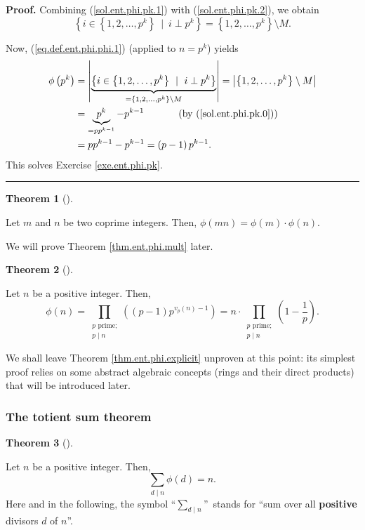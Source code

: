 \documentclass[numbers=enddot,12pt,final,onecolumn,notitlepage]{scrartcl}%
\numberwithin{exer}{subsection}
\theoremstyle{definition}
\newtheorem{theo}{Theorem}[subsection]
\newenvironment{theorem}[1][]
{\begin{theo}[#1]\begin{leftbar}}
{\end{leftbar}\end{theo}}
\newenvironment{fineprint}{\begin{small}}{\end{small}}
\newenvironment{proof}[1][Proof]{\noindent\textbf{#1.} }{\ \rule{0.5em}{0.5em}}
\let\sumnonlimits\sum
\let\prodnonlimits\prod
\renewcommand{\sum}{\sumnonlimits\limits}
\renewcommand{\prod}{\prodnonlimits\limits}
\begin{document}
\begin{fineprint}
\begin{proof}
Combining (\ref{sol.ent.phi.pk.1}) with (\ref{sol.ent.phi.pk.2}), we obtain%
\[
\left\{  i\in\left\{  1,2,\ldots,p^{k}\right\}  \ \mid\ i\perp p^{k}\right\}
=\left\{  1,2,\ldots,p^{k}\right\}  \setminus M.
\]


Now, (\ref{eq.def.ent.phi.phi.1}) (applied to $n=p^{k}$) yields%
\begin{align*}
\phi\left(  p^{k}\right)   &  =\left\vert \underbrace{\left\{  i\in\left\{
1,2,\ldots,p^{k}\right\}  \ \mid\ i\perp p^{k}\right\}  }_{=\left\{
1,2,\ldots,p^{k}\right\}  \setminus M}\right\vert =\left\vert \left\{
1,2,\ldots,p^{k}\right\}  \setminus M\right\vert \\
&  =\underbrace{p^{k}}_{=pp^{k-1}}-p^{k-1}\ \ \ \ \ \ \ \ \ \ \left(  \text{by
(\ref{sol.ent.phi.pk.0})}\right) \\
&  =pp^{k-1}-p^{k-1}=\left(  p-1\right)  p^{k-1}.
\end{align*}
This solves Exercise \ref{exe.ent.phi.pk}.
\end{proof}
\end{fineprint}

\begin{theorem}
\label{thm.ent.phi.mult}Let $m$ and $n$ be two coprime integers. Then,
$\phi\left(  mn\right)  =\phi\left(  m\right)  \cdot\phi\left(  n\right)  $.
\end{theorem}

We will prove Theorem \ref{thm.ent.phi.mult} later.

\begin{theorem}
\label{thm.ent.phi.explicit}Let $n$ be a positive integer. Then,%
\[
\phi\left(  n\right)  =\prod_{\substack{p\text{ prime;}\\p\mid n}}\left(
\left(  p-1\right)  p^{v_{p}\left(  n\right)  -1}\right)  =n\cdot
\prod_{\substack{p\text{ prime;}\\p\mid n}}\left(  1-\dfrac{1}{p}\right)  .
\]

\end{theorem}

We shall leave Theorem \ref{thm.ent.phi.explicit} unproven at this point: its
simplest proof relies on some abstract algebraic concepts (rings and their
direct products) that will be introduced later.

\subsubsection{The totient sum theorem}

\begin{theorem}
\label{thm.ent.phi.sum-div}Let $n$ be a positive integer. Then,%
\[
\sum_{d\mid n}\phi\left(  d\right)  =n.
\]
Here and in the following, the symbol \textquotedblleft$\sum_{d\mid n}%
$\textquotedblright\ stands for \textquotedblleft sum over all
\textbf{positive} divisors $d$ of $n$\textquotedblright.
\end{theorem}
\end{document}
